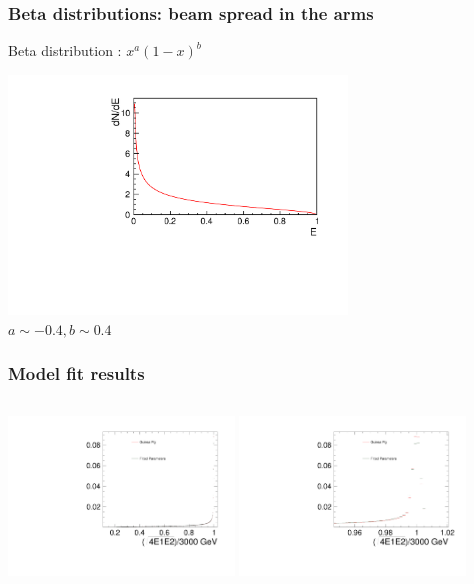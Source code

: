 \documentclass{beamer}
\begin{document}
\begin{frame}
\frametitle{Beta distributions: beam spread in the
arms}\label{slide:betadistspreadarm} 
Beta distribution : $x^a(1-x)^b$ 
\begin{center}
\includegraphics[width=9cm]{BetaFunction_beamspreadarms.pdf}\\
$a\sim-0.4, b\sim0.4$
\end{center}
\end{frame}

\begin{frame}
\frametitle{Model fit results}
\begin{columns}[c]
\column{6cm}
\includegraphics[width=6cm]{FullSpectrumFCAL_notlog.pdf}
\column{6cm}
\includegraphics[width=6cm]{FullSpectrumFCAL_zoom_notlog.pdf}
\end{columns}
\end{frame}
\end{document}

